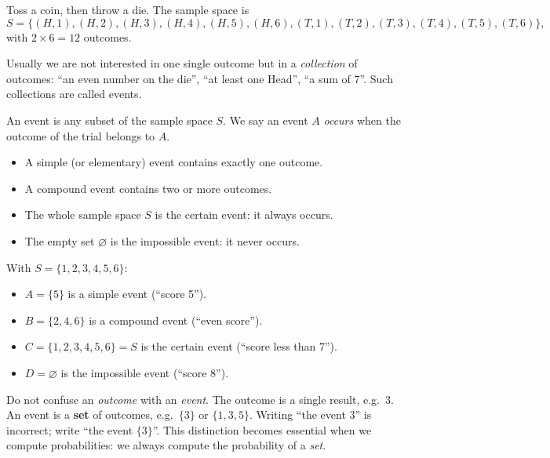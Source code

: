 \documentclass[11pt]{article}
\newcommand{\cle}[1]{{\popxbold\color{popdark}#1}}
\newcounter{popsec}
\newcounter{popsub}
\newcommand{\courssub}[1]{%
  \stepcounter{popsub}%
  \par\vspace{9pt}\noindent{\popxbold\fontsize{11.5}{13}\selectfont\color{popink}{\color{poporange}\thepopsec.\thepopsub}\hspace{6pt}#1}\par\nopagebreak\vspace{4pt}
}
\begin{document}
\begin{exemplebox}
Toss a coin, then throw a die. The sample space is
\[ S = \{(H,1),(H,2),(H,3),(H,4),(H,5),(H,6),(T,1),(T,2),(T,3),(T,4),(T,5),(T,6)\}, \]
with $2 \times 6 = 12$ outcomes.
\end{exemplebox}

\courssub{Events and Types of Events}

Usually we are not interested in one single outcome but in a \emph{collection} of outcomes: ``an even number on the die'', ``at least one Head'', ``a sum of 7''. Such collections are called events.

\begin{definition}
An \cle{event} is any subset of the sample space $S$. We say an event $A$ \emph{occurs} when the outcome of the trial belongs to $A$.
\begin{itemize}
\item A \cle{simple} (or \cle{elementary}) \cle{event} contains exactly one outcome.
\item A \cle{compound event} contains two or more outcomes.
\item The whole sample space $S$ is the \cle{certain event}: it always occurs.
\item The empty set $\varnothing$ is the \cle{impossible event}: it never occurs.
\end{itemize}
\end{definition}

\begin{exemplebox}
With $S = \{1,2,3,4,5,6\}$:
\begin{itemize}
\item $A = \{5\}$ is a simple event (``score 5'').
\item $B = \{2,4,6\}$ is a compound event (``even score'').
\item $C = \{1,2,3,4,5,6\} = S$ is the certain event (``score less than 7'').
\item $D = \varnothing$ is the impossible event (``score 8'').
\end{itemize}
\end{exemplebox}

\begin{attention}
Do not confuse an \emph{outcome} with an \emph{event}. The outcome is a single result, e.g.\ $3$. An event is a \textbf{set} of outcomes, e.g.\ $\{3\}$ or $\{1,3,5\}$. Writing ``the event $3$'' is incorrect; write ``the event $\{3\}$''. This distinction becomes essential when we compute probabilities: we always compute the probability of a \emph{set}.
\end{attention}
\end{document}
